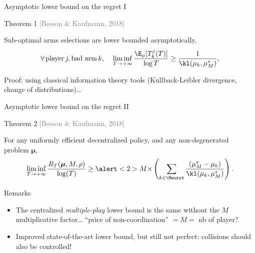 \documentclass[12pt,english,ignorenonframetext,]{beamer}
\providecommand{\tightlist}{%
  \setlength{\itemsep}{0pt}\setlength{\parskip}{0pt}}
\begin{document}
\begin{frame}{Asymptotic lower bound on the regret I}

\begin{block}{Theorem 1
  \hfill{}\textcolor{gray}{[Besson \& Kaufmann, 2018]}}

  Sub-optimal arms selections are lower bounded asymptotically,
  \[\forall\, \text{player}\, j, \text{bad arm}\,k,\;\;\;\; \mathop{\lim\inf}\limits_{T \to +\infty} \frac{\E_{\mu}[T_k^j(T)]}{\log T} \geq \frac{1}{\kl(\mu_k, \mu_M^*)},\]

\end{block}

Proof: using classical information theory tools (Kullback-Leibler divergence, change of distributions)\dots
{}

\end{frame}

\begin{frame}{Asymptotic lower bound on the regret II}

\begin{block}{Theorem 2
\hfill{}\textcolor{gray}{[Besson \& Kaufmann, 2018]}}

\small{For any uniformly efficient decentralized policy, and any
non-degenerated problem \(\boldsymbol{\mu}\),} \vspace*{-10pt}
\[ \mathop{\lim\inf}\limits_{T \to +\infty} \frac{R_T(\boldsymbol{\mu}, M, \rho)}{\log(T)} \geq
\alert<2>{M \times} \left( \sum_{k \in \Mworst} \frac{(\mu_M^* -  \mu_k)}{\kl(\mu_k, \mu_M^*)} \right) . \]
\end{block}

\pause

\begin{block}{Remarks}

\begin{itemize}\tightlist
\item
  The centralized \emph{multiple-play} lower bound is the same without
  the \alert{\(M\) multiplicative factor}\ldots{}
  \hook \alert{``price of non-coordination''} \(= M =\) nb of player?
\item
  Improved state-of-the-art lower bound, but still not perfect:
  collisions should also be controlled!
\end{itemize}

\end{block}

\end{frame}
\end{document}
